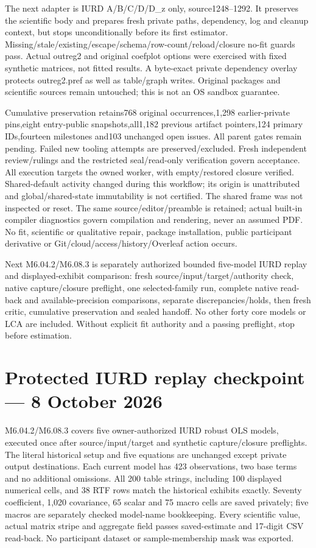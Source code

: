 \documentclass[11pt,a4paper]{article}
\begin{document}
The next adapter is IURD A/B/C/D/D\_z only, source1248--1292. It preserves
the scientific body and prepares fresh private paths, dependency, log and
cleanup context, but stops unconditionally before its first estimator.
Missing/stale/existing/escape/schema/row-count/reload/closure no-fit guards
pass. Actual outreg2 and original coefplot options were exercised with fixed
synthetic matrices, not fitted results. A byte-exact private dependency
overlay protects outreg2.pref as well as table/graph writes. Original packages
and scientific sources remain untouched; this is not an OS sandbox guarantee.

Cumulative preservation retains768 original occurrences,1,298 earlier-private
pins,eight entry-public snapshots,all1,182 previous artifact pointers,124
primary IDs,fourteen milestones and103 unchanged open issues. All parent
gates remain pending. Failed new tooling attempts are preserved/excluded.
Fresh independent review/rulings and the restricted seal/read-only verification
govern acceptance. All execution targets the owned worker, with empty/restored
closure verified. Shared-default activity changed during this workflow; its
origin is unattributed and global/shared-state immutability is not certified.
The shared frame was not inspected or reset. The same source/editor/preamble
is retained; actual built-in
compiler diagnostics govern compilation and rendering, never an assumed PDF.
No fit, scientific or qualitative repair, package installation, public
participant derivative or Git/cloud/access/history/Overleaf action occurs.

Next M6.04.2/M6.08.3 is separately authorized bounded five-model IURD replay
and displayed-exhibit comparison: fresh source/input/target/authority check,
native capture/closure preflight, one selected-family run, complete native
read-back and available-precision comparisons, separate discrepancies/holds,
then fresh critic, cumulative preservation and sealed handoff. No other forty
core models or LCA are included. Without explicit fit authority and a passing
preflight, stop before estimation.

\section*{Protected IURD replay checkpoint --- 8 October 2026}
M6.04.2/M6.08.3 covers five owner-authorized IURD robust OLS models, executed once after source/input/target and synthetic capture/closure preflights. The literal historical setup and five equations are unchanged except private output destinations. Each current model has 423 observations, two base terms and no additional omissions. All 200 table strings, including 100 displayed numerical cells, and 38 RTF rows match the historical exhibits exactly. Seventy coefficient, 1,020 covariance, 65 scalar and 75 macro cells are saved privately; five macros are separately checked model-name bookkeeping. Every scientific value, actual matrix stripe and aggregate field passes saved-estimate and 17-digit CSV read-back. No participant dataset or sample-membership mask was exported.
\end{document}
